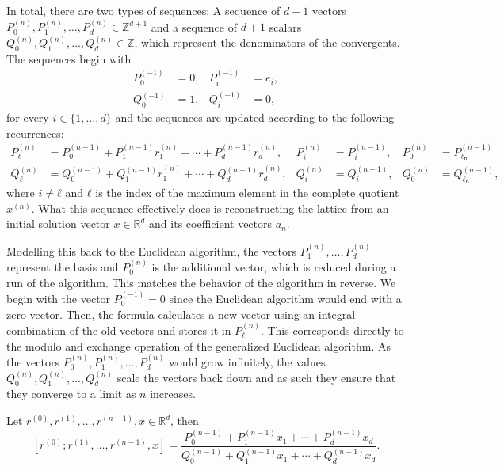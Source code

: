 In total, there are two types of sequences:
A sequence of $d+1$ vectors $P_0^{(n)}, P_1^{(n)}, …, P_d^{(n)} ∈ ℤ^{d+1}$ and a sequence
of $d+1$ scalars $Q_0^{(n)}, Q_1^{(n)}, …, Q_d^{(n)} ∈ ℤ$,
which represent the denominators of the convergents.
The sequences begin with
\begin{align*}
  P_0^{(-1)} & = 0, & P_i^{(-1)} & = e_i, \\
  Q_0^{(-1)} & = 1, & Q_i^{(-1)} & = 0,
\end{align*}
for every $i ∈ \{1, …, d\}$ and the sequences are updated according to the
following recurrences:
\begin{align*}
  P_ℓ^{(n)} & = P_0^{(n-1)} + P_1^{(n-1)} r_1^{(n)} + ⋯ + P_d^{(n-1)} r_d^{(n)}, &
  P_i^{(n)} & = P_i^{(n-1)}, &
  P_0^{(n)} & = P_{ℓₙ}^{(n-1)} \\
  Q_ℓ^{(n)} & = Q_0^{(n-1)} + Q_1^{(n-1)} r_1^{(n)} + ⋯ + Q_d^{(n-1)} r_d^{(n)}, &
  Q_i^{(n)} & = Q_i^{(n-1)}, &
  Q_0^{(n)} & = Q_{ℓₙ}^{(n-1)},
\end{align*}
where $i ≠ ℓ$ and $ℓ$ is the index of the maximum element in the complete
quotient $x^{(n)}$. %
What this sequence effectively does is reconstructing the lattice from an
initial solution vector $x ∈ ℝ^d$ and its coefficient vectors $a_n$.

Modelling this back to the Euclidean algorithm,
the vectors $P_1^{(n)}, …, P_d^{(n)}$ represent the basis and $P_0^{(n)}$ is
the additional vector, which is reduced during a run of the algorithm.
This matches the behavior of the algorithm in reverse.
We begin with the vector $P_0^{(-1)} = 0$ since the Euclidean algorithm
would end with a zero vector.
Then, the formula calculates a new vector using an integral combination of the
old vectors and stores it in $P_ℓ^{(n)}$.
This corresponds directly to the modulo and exchange operation of the
generalized Euclidean algorithm.
As the vectors $P_0^{(n)}, P_1^{(n)}, …, P_d^{(n)}$ would grow infinitely, the
values $Q_0^{(n)}, Q_1^{(n)}, …, Q_d^{(n)}$ scale the vectors back down and as
such they ensure that they converge to a limit as $n$ increases.

\begin{lemma}
  \label{lem:mdcf-wallis}
  Let $r^{(0)}, r^{(1)}, …, r^{(n-1)}, x ∈ ℝ^d$, then
  \[
    [r^{(0)}; r^{(1)}, …, r^{(n-1)}, x]
    = \frac{P_0^{(n-1)} + P_1^{(n-1)} x_1 + ⋯ + P_d^{(n-1)} x_d}{Q_0^{(n-1)} + Q_1^{(n-1)} x_1 + ⋯ + Q_d^{(n-1)} x_d}.
  \]
\end{lemma}

